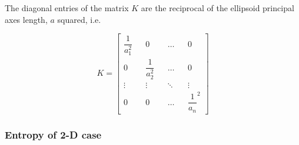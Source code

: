 \documentclass{article}
\begin{document}
The diagonal entries of the matrix $K$ are the reciprocal of the ellipsoid principal axes length, $a$ squared, i.e.

\[
K = \begin{bmatrix} \dfrac{1}{a_1^2} && 0 && \dots && 0 \\0 && \dfrac{1}{a_2^2} && \dots && 0 \\ \vdots && \vdots && \ddots && \vdots \\ 0 && 0 && \dots && \dfrac{1}{a_n}^2 \end{bmatrix}
\]

\subsubsection{Entropy of 2-D case}

\end{document}
